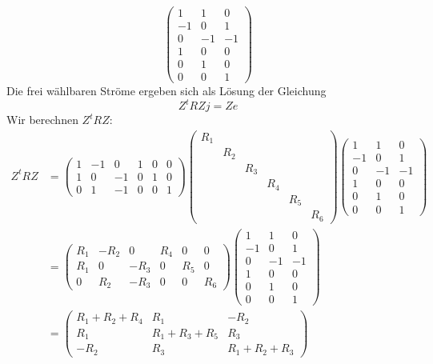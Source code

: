 \begin{loesung}
\begin{teilaufgaben}
\[\begin{pmatrix}
 1& 1& 0\\
-1& 0& 1\\
 0&-1&-1\\
 1& 0& 0\\
 0& 1& 0\\
 0& 0& 1
\end{pmatrix}
\]
Die frei wählbaren Ströme ergeben sich als Lösung der
Gleichung
\[
Z^tRZj=Ze
\]
Wir berechnen $Z^tRZ$:
\begin{align*}
Z^tRZ&=
\begin{pmatrix}
   1& -1&  0&  1&  0&  0\\
   1&  0& -1&  0&  1&  0\\
   0&  1& -1&  0&  0&  1
\end{pmatrix}
\begin{pmatrix}
R_1&   &   &   &   &   \\
   &R_2&   &   &   &   \\
   &   &R_3&   &   &   \\
   &   &   &R_4&   &   \\
   &   &   &   &R_5&   \\
   &   &   &   &   &R_6
\end{pmatrix}
\begin{pmatrix}
 1& 1& 0\\
-1& 0& 1\\
 0&-1&-1\\
 1& 0& 0\\
 0& 1& 0\\
 0& 0& 1
\end{pmatrix}
\\
&=
\begin{pmatrix}
 R_1&-R_2&   0& R_4&   0&   0\\
 R_1&   0&-R_3&   0& R_5&   0\\
   0& R_2&-R_3&   0&   0& R_6
\end{pmatrix}
\begin{pmatrix}
 1& 1& 0\\
-1& 0& 1\\
 0&-1&-1\\
 1& 0& 0\\
 0& 1& 0\\
 0& 0& 1
\end{pmatrix}
\\
&=
\begin{pmatrix}
R_1+R_2+R_4&R_1&-R_2\\
R_1&R_1+R_3+R_5&R_3\\
-R_2&R_3&R_1+R_2+R_3
\end{pmatrix}

\end{align*}
\end{teilaufgaben}
\end{loesung}
